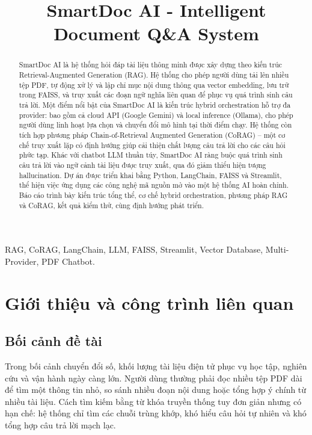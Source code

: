 \documentclass[10pt, conference, a4paper, compsocconf]{IEEEtran}
\begin{document}
\fontsize{10}{12}\selectfont
{}
\title{SmartDoc AI - Intelligent Document Q\&A System}
\author{
}
\maketitle
\begin{abstract}
SmartDoc AI là hệ thống hỏi đáp tài liệu thông minh được xây dựng theo kiến trúc Retrieval-Augmented Generation (RAG). Hệ thống cho phép người dùng tải lên nhiều tệp PDF, tự động xử lý và lập chỉ mục nội dung thông qua vector embedding, lưu trữ trong FAISS, và truy xuất các đoạn ngữ nghĩa liên quan để phục vụ quá trình sinh câu trả lời. Một điểm nổi bật của SmartDoc AI là kiến trúc hybrid orchestration hỗ trợ đa provider: bao gồm cả cloud API (Google Gemini) và local inference (Ollama), cho phép người dùng linh hoạt lựa chọn và chuyển đổi mô hình tại thời điểm chạy. Hệ thống còn tích hợp phương pháp Chain-of-Retrieval Augmented Generation (CoRAG) -- một cơ chế truy xuất lặp có định hướng giúp cải thiện chất lượng câu trả lời cho các câu hỏi phức tạp. Khác với chatbot LLM thuần túy, SmartDoc AI ràng buộc quá trình sinh câu trả lời vào ngữ cảnh tài liệu được truy xuất, qua đó giảm thiểu hiện tượng hallucination. Dự án được triển khai bằng Python, LangChain, FAISS và Streamlit, thể hiện việc ứng dụng các công nghệ mã nguồn mở vào một hệ thống AI hoàn chỉnh. Báo cáo trình bày kiến trúc tổng thể, cơ chế hybrid orchestration, phương pháp RAG và CoRAG, kết quả kiểm thử, cùng định hướng phát triển.
\end{abstract}
\begin{IEEEkeywords}
RAG, CoRAG, LangChain, LLM, FAISS, Streamlit, Vector Database, Multi-Provider, PDF Chatbot.
\end{IEEEkeywords}
\IEEEpeerreviewmaketitle

\section{Giới thiệu và công trình liên quan}
\subsection{Bối cảnh đề tài}
Trong bối cảnh chuyển đổi số, khối lượng tài liệu điện tử phục vụ học tập, nghiên cứu và vận hành ngày càng lớn. Người dùng thường phải đọc nhiều tệp PDF dài để tìm một thông tin nhỏ, so sánh nhiều đoạn nội dung hoặc tổng hợp ý chính từ nhiều tài liệu. Cách tìm kiếm bằng từ khóa truyền thống tuy đơn giản nhưng có hạn chế: hệ thống chỉ tìm các chuỗi trùng khớp, khó hiểu câu hỏi tự nhiên và khó tổng hợp câu trả lời mạch lạc.
\end{document}
